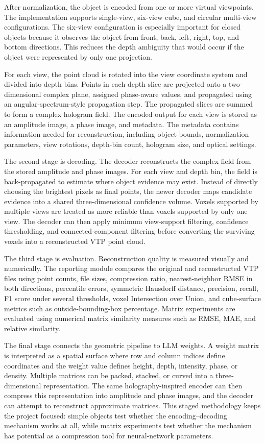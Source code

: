 \documentclass{article}
\begin{document}
\begin{normalsize}
After normalization, the object is encoded from one or more virtual viewpoints. The implementation supports single-view, six-view cube, and circular multi-view configurations. The six-view configuration is especially important for closed objects because it observes the object from front, back, left, right, top, and bottom directions. This reduces the depth ambiguity that would occur if the object were represented by only one projection.

For each view, the point cloud is rotated into the view coordinate system and divided into depth bins. Points in each depth slice are projected onto a two-dimensional complex plane, assigned phase-aware values, and propagated using an angular-spectrum-style propagation step. The propagated slices are summed to form a complex hologram field. The encoded output for each view is stored as an amplitude image, a phase image, and metadata. The metadata contains information needed for reconstruction, including object bounds, normalization parameters, view rotations, depth-bin count, hologram size, and optical settings.

The second stage is decoding. The decoder reconstructs the complex field from the stored amplitude and phase images. For each view and depth bin, the field is back-propagated to estimate where object evidence may exist. Instead of directly choosing the brightest pixels as final points, the newer decoder maps candidate evidence into a shared three-dimensional confidence volume. Voxels supported by multiple views are treated as more reliable than voxels supported by only one view. The decoder can then apply minimum view-support filtering, confidence thresholding, and connected-component filtering before converting the surviving voxels into a reconstructed VTP point cloud.

The third stage is evaluation. Reconstruction quality is measured visually and numerically. The reporting module compares the original and reconstructed VTP files using point counts, file sizes, compression ratio, nearest-neighbor RMSE in both directions, percentile errors, symmetric Hausdorff distance, precision, recall, F1 score under several thresholds, voxel Intersection over Union, and cube-surface metrics such as outside-bounding-box percentage. Matrix experiments are evaluated using numerical matrix similarity measures such as RMSE, MAE, and relative similarity.

The final stage connects the geometric pipeline to LLM weights. A weight matrix is interpreted as a spatial surface where row and column indices define coordinates and the weight value defines height, depth, intensity, phase, or density. Multiple matrices can be packed, stacked, or curved into a three-dimensional representation. The same holography-inspired encoder can then compress this representation into amplitude and phase images, and the decoder can attempt to reconstruct approximate matrices. This staged methodology keeps the project focused: simple objects test whether the encoding--decoding mechanism works at all, while matrix experiments test whether the mechanism has potential as a compression tool for neural-network parameters.


\end{normalsize}
\end{document}
